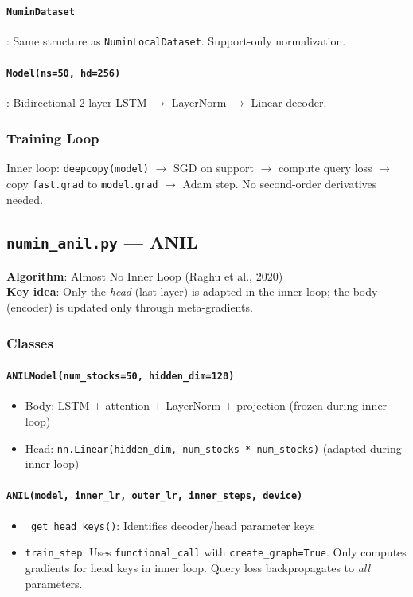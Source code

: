 \documentclass[11pt,a4paper]{article}
\begin{document}
\paragraph{\texttt{NuminDataset}}: Same structure as \texttt{NuminLocalDataset}. Support-only normalization.

\paragraph{\texttt{Model(ns=50, hd=256)}}: Bidirectional 2-layer LSTM $\to$ LayerNorm $\to$ Linear decoder.

\subsubsection{Training Loop}
Inner loop: \texttt{deepcopy(model)} $\to$ SGD on support $\to$ compute query loss $\to$ copy \texttt{fast.grad} to \texttt{model.grad} $\to$ Adam step. No second-order derivatives needed.

\subsection{\texttt{numin\_anil.py} --- ANIL}
\textbf{Algorithm}: Almost No Inner Loop (Raghu et al., 2020)\\
\textbf{Key idea}: Only the \emph{head} (last layer) is adapted in the inner loop; the body (encoder) is updated only through meta-gradients.

\subsubsection{Classes}
\paragraph{\texttt{ANILModel(num\_stocks=50, hidden\_dim=128)}}
\begin{itemize}[nosep]
  \item Body: LSTM + attention + LayerNorm + projection (frozen during inner loop)
  \item Head: \texttt{nn.Linear(hidden\_dim, num\_stocks * num\_stocks)} (adapted during inner loop)
\end{itemize}

\paragraph{\texttt{ANIL(model, inner\_lr, outer\_lr, inner\_steps, device)}}
\begin{itemize}[nosep]
  \item \texttt{\_get\_head\_keys()}: Identifies decoder/head parameter keys
  \item \texttt{train\_step}: Uses \texttt{functional\_call} with \texttt{create\_graph=True}. Only computes gradients for head keys in inner loop. Query loss backpropagates to \emph{all} parameters.
\end{itemize}
\end{document}
